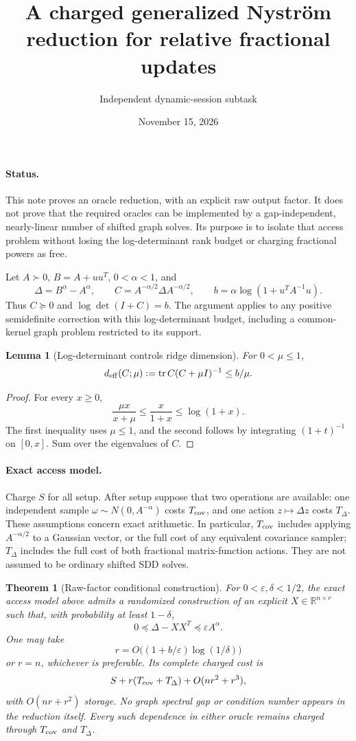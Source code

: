 \documentclass[11pt]{article}
\title{A charged generalized Nystr\"om reduction for relative fractional updates}
\author{Independent dynamic-session subtask}
\date{November 15, 2026}
\newtheorem{theorem}{Theorem}
\newtheorem{lemma}{Lemma}
\newcommand{\tr}{\operatorname{tr}}
\newcommand{\R}{\mathbb R}
\begin{document}
\maketitle

\paragraph{Status.}
This note proves an oracle reduction, with an explicit raw output factor.
It does not prove that the required oracles can be implemented by a
gap-independent, nearly-linear number of shifted graph solves.  Its
purpose is to isolate that access problem without losing the
log-determinant rank budget or charging fractional powers as free.

Let $A\succ0$, $B=A+uu^T$, $0<\alpha<1$, and
\[
 \Delta=B^\alpha-A^\alpha,\qquad
 C=A^{-\alpha/2}\Delta A^{-\alpha/2},\qquad
 b=\alpha\log(1+u^TA^{-1}u).
\]
Thus $C\succeq0$ and $\log\det(I+C)=b$.  The argument applies to
any positive semidefinite correction with this log-determinant budget,
including a common-kernel graph problem restricted to its support.

\begin{lemma}[Log-determinant controls ridge dimension]
For $0<\mu\le1$,
\[
 d_{\rm eff}(C;\mu):=\tr C(C+\mu I)^{-1}\le b/\mu.
\]
\end{lemma}
\begin{proof}
For every $x\ge0$,
\[
 \frac{\mu x}{x+\mu}\le\frac{x}{1+x}\le\log(1+x).
\]
The first inequality uses $\mu\le1$, and the second follows by
integrating $(1+t)^{-1}$ on $[0,x]$.  Sum over the eigenvalues of $C$.
\end{proof}

\paragraph{Exact access model.}
Charge $S$ for all setup.  After setup suppose that two operations are
available: one independent sample $\omega\sim N(0,A^{-\alpha})$ costs
$T_{\rm cov}$, and one action $z\mapsto\Delta z$ costs $T_\Delta$.
These assumptions concern exact arithmetic.  In particular,
$T_{\rm cov}$ includes applying $A^{-\alpha/2}$ to a Gaussian vector,
or the full cost of any equivalent covariance sampler; $T_\Delta$
includes the full cost of both fractional matrix-function actions.
They are not assumed to be ordinary shifted SDD solves.

\begin{theorem}[Raw-factor conditional construction]
For $0<\varepsilon,\delta<1/2$, the exact access model above admits
a randomized construction of an explicit $X\in\R^{n\times r}$ such
that, with probability at least $1-\delta$,
\[
 0\preceq\Delta-XX^T\preceq\varepsilon A^\alpha.
\]
One may take
\[
 r=O\bigl((1+b/\varepsilon)\log(1/\delta)\bigr)
\]
or $r=n$, whichever is preferable.  Its complete charged cost is
\[
 S+r(T_{\rm cov}+T_\Delta)+O(nr^2+r^3),
\]
with $O(nr+r^2)$ storage.  No graph spectral gap or condition number
appears in the reduction itself.  Every such dependence in either
oracle remains charged through $T_{\rm cov}$ and $T_\Delta$.
\end{theorem}
\end{document}
